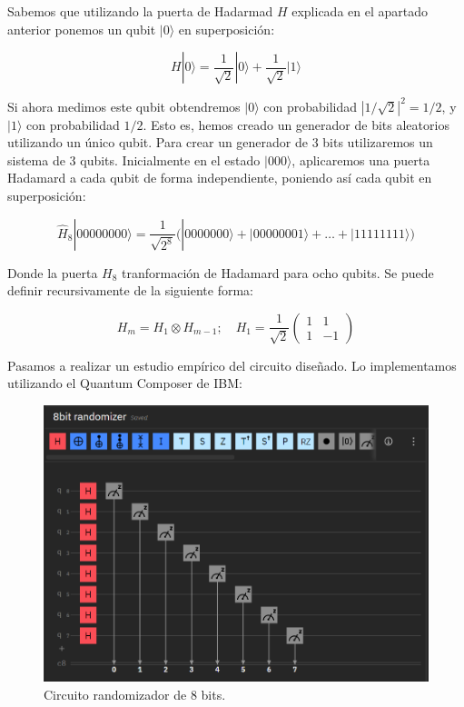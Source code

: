 \documentclass[11pt]{article}
\newcommand{\ra}{\rangle}
\theoremstyle{plain}
\begin{document}
Sabemos que utilizando la puerta de Hadarmad $H$ explicada en el apartado anterior ponemos un qubit $|0\ra$ en superposición:

\[
	H|0\ra = \frac{1}{\sqrt 2} |0\ra + \frac{1}{\sqrt 2} |1\ra
\]

Si ahora medimos este qubit obtendremos $|0\ra$ con probabilidad $|1/\sqrt 2|^2 = 1/2$, y $|1\ra$ con probabilidad $1/2$. Esto es, hemos creado un generador de bits aleatorios utilizando un único qubit. Para crear un generador de 3 bits utilizaremos un sistema de 3 qubits. Inicialmente en el estado $|000\ra$, aplicaremos una puerta Hadamard a cada qubit de forma independiente, poniendo así cada qubit en superposición:

\[
	\hat H_8|00000000\ra = \frac{1}{\sqrt{2^8}}\big(|0000000\ra + |00000001\ra + \ldots + |11111111\ra\big)
\]

Donde la puerta $H_8$ tranformación de Hadamard para ocho qubits. Se puede definir recursivamente de la siguiente forma:

\[
	H_m = H_1 \otimes H_{m-1}; \quad H_1 = \frac{1}{\sqrt 2}
	\begin{pmatrix}
		1 & 1 \\
		1 & -1 
	\end{pmatrix}
\]

Pasamos a realizar un estudio empírico del circuito diseñado. Lo implementamos utilizando el Quantum Composer de IBM:

\begin{figure}[H]
	\centering
	\includegraphics[scale=0.7]{figures/8bits_rand.png}
	\caption{Circuito randomizador de 8 bits.}
\end{figure}
\end{document}
